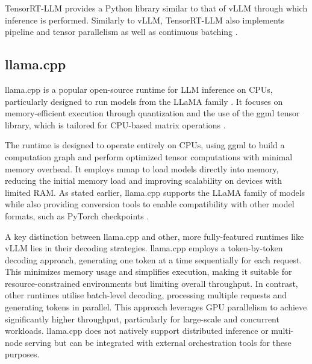 \documentclass[12pt,twoside]{report}
\begin{document}
TensorRT-LLM provides a Python library similar to that of vLLM through which inference is performed.
Similarly to vLLM, TensorRT-LLM also implements pipeline and tensor parallelism as well as continuous batching \cite{nvidiainferencewhitepaper}.

\subsection{llama.cpp}\label{subsection:llama.cpp}

llama.cpp is a popular open-source runtime for LLM inference on CPUs, particularly designed to run models from the LLaMA family \cite{touvron2023llama}. 
It focuses on memory-efficient execution through quantization and the use of the ggml tensor library, which is tailored for CPU-based matrix operations \cite{ggml}.

The runtime is designed to operate entirely on CPUs, using ggml to build a computation graph and perform optimized tensor computations with minimal memory overhead. 
It employs mmap to load models directly into memory, reducing the initial memory load and improving scalability on devices with limited RAM. 
As stated earlier, llama.cpp supports the LLaMA family of models while also providing conversion tools to enable compatibility with other model formats, such as PyTorch checkpoints \cite{paszke2019pytorch}.

A key distinction between llama.cpp and other, more fully-featured runtimes like vLLM lies in their decoding strategies. 
llama.cpp employs a token-by-token decoding approach, generating one token at a time sequentially for each request. 
This minimizes memory usage and simplifies execution, making it suitable for resource-constrained environments but limiting overall throughput.
In contrast, other runtimes utilise batch-level decoding, processing multiple requests and generating tokens in parallel.
This approach leverages GPU parallelism to achieve significantly higher throughput, particularly for large-scale and concurrent workloads.
llama.cpp does not natively support distributed inference or multi-node serving but can be integrated with external orchestration tools \cite{ray} for these purposes.
\end{document}
